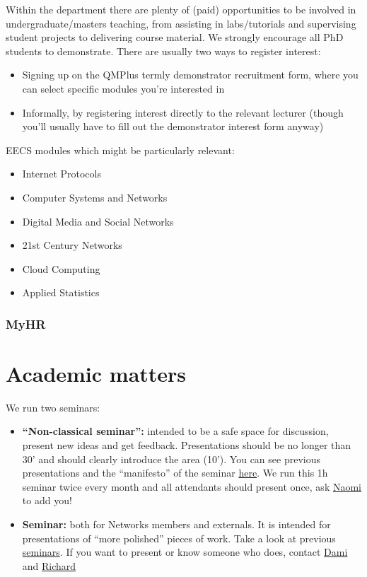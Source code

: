 \documentclass{article}
\begin{document}
Within the department there are plenty of (paid) opportunities to be involved in undergraduate/masters teaching, from assisting in labs/tutorials and supervising student projects to delivering course material. We strongly encourage all PhD students to demonstrate. There are usually two ways to register interest:
\begin{itemize}
    \item Signing up on the QMPlus termly demonstrator recruitment form, where you can select specific modules you're interested in
    \item Informally, by registering interest directly to the relevant lecturer (though you'll usually have to fill out the demonstrator interest form anyway)
\end{itemize}

EECS modules which might be particularly relevant:
\begin{itemize}
    \item Internet Protocols
    \item Computer Systems and Networks
    \item Digital Media and Social Networks
    \item 21st Century Networks
    \item Cloud Computing
    \item Applied Statistics
\end{itemize}

\subsubsection{MyHR}

\section{Academic matters}
We run two seminars:
\begin{itemize}
    \item \textbf{``Non-classical seminar'':}  intended to be  a safe space for discussion, present new ideas and get feedback. Presentations should be no longer than 30' and should clearly introduce the area (10'). You can see previous presentations and the ``manifesto'' of the seminar \href{https://drive.google.com/open?id=1miDiEmRSSHpveHaXqW6FR0U9DG8uYKeD}{here}. We run this 1h seminar twice every month and all attendants should present once, ask \href{mailto:n.a.arnold@qmul.ac.uk}{Naomi} to add you!
    \item \textbf{Seminar:} both for Networks members and externals. It is intended for presentations of ``more polished'' pieces of work. Take a look at previous \href{http://networks.eecs.qmul.ac.uk/category/seminar/}{seminars}. If you want to present or know someone who does, contact \href{mailto:d.i.ibosiola@qmul.ac.uk}{Dami} and \href{mailto:r.clegg@qmul.ac.uk}{Richard}
\end{itemize}
\end{document}
